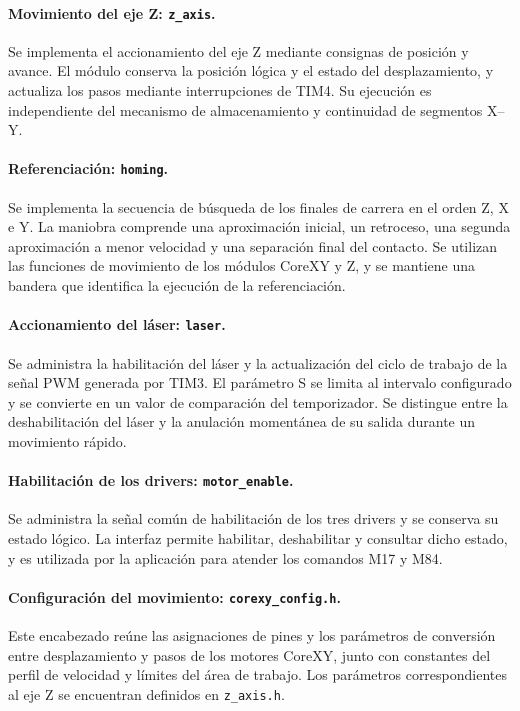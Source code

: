 \documentclass[blue,fullpaper]{ludusofficial}  %
\begin{document}
\paragraph{Movimiento del eje Z: \texttt{z\_axis}.}
Se implementa el accionamiento del eje Z mediante
consignas de posición y avance. El módulo conserva
la posición lógica y el estado del desplazamiento,
y actualiza los pasos mediante interrupciones de TIM4.
Su ejecución es independiente del mecanismo de
almacenamiento y continuidad de segmentos X--Y.

\paragraph{Referenciación: \texttt{homing}.}
Se implementa la secuencia de búsqueda de los finales
de carrera en el orden Z, X e Y. La maniobra comprende
una aproximación inicial, un retroceso, una segunda
aproximación a menor velocidad y una separación final
del contacto. Se utilizan las funciones de movimiento
de los módulos CoreXY y Z, y se mantiene una bandera
que identifica la ejecución de la referenciación.

\paragraph{Accionamiento del láser: \texttt{laser}.}
Se administra la habilitación del láser y la actualización
del ciclo de trabajo de la señal PWM generada por TIM3.
El parámetro S se limita al intervalo configurado y se
convierte en un valor de comparación del temporizador.
Se distingue entre la deshabilitación del láser y la
anulación momentánea de su salida durante un movimiento
rápido.

\paragraph{Habilitación de los drivers:
\texttt{motor\_enable}.}
Se administra la señal común de habilitación de los
tres drivers y se conserva su estado lógico. La interfaz
permite habilitar, deshabilitar y consultar dicho estado,
y es utilizada por la aplicación para atender los
comandos M17 y M84.

\paragraph{Configuración del movimiento:
\texttt{corexy\_config.h}.}
Este encabezado reúne las asignaciones de pines y
los parámetros de conversión entre desplazamiento
y pasos de los motores CoreXY, junto con constantes
del perfil de velocidad y límites del área de trabajo.
Los parámetros correspondientes al eje Z se encuentran
definidos en \texttt{z\_axis.h}.
\end{document}
